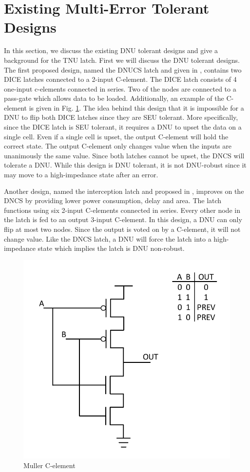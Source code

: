 \section{Existing Multi-Error Tolerant Designs} \label{sec:DNUdes}

In this section, we discuss the existing DNU tolerant designs and give a background for the TNU latch. First we will discuss the DNU tolerant designs. The first proposed design, named the DNUCS latch and given in \cite{DNCS}, contains two DICE latches connected to a 2-input C-element. The DICE latch consists of 4 one-input c-elements connected in series. Two of the nodes are connected to a pass-gate which allows data to be loaded. Additionally, an example of the C-element is given in Fig. \ref{Cele_fig}. The idea behind this design that it is impossible for a DNU to flip both DICE latches since they are SEU tolerant. More specifically, since the DICE latch is SEU tolerant, it requires a DNU to upset the data on a single cell. Even if a single cell is upset, the output C-element will hold the correct state. The output C-element only changes value when the inputs are unanimously the same value. Since both latches cannot be upset, the DNCS will tolerate a DNU. While this design is DNU tolerant, it is not DNU-robust since it may move to a high-impedance state after an error. 

Another design, named the interception latch and proposed in \cite{Inter}, improves on the DNCS by providing lower power consumption, delay and area. The latch functions using six 2-input C-elements connected in series. Every other node in the latch is fed to an output 3-input C-element. In this design, a DNU can only flip at most two nodes. Since the output is voted on by a C-element, it will not change value. Like the DNCS latch, a DNU will force the latch into a high-impedance state which implies the latch is DNU non-robust.

\begin{figure}[!htbp]
	\centering
	\includegraphics[width=0.55\linewidth]{Figures/C_ele}
	\caption{Muller C-element}
	\label{Cele_fig}
\end{figure}

